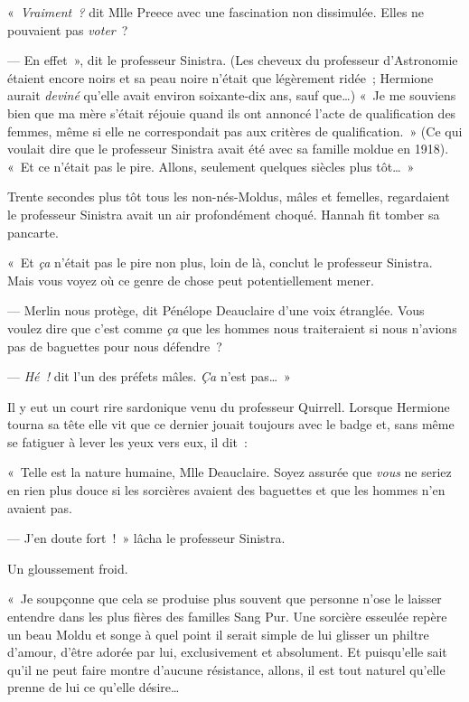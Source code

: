 «~\emph{Vraiment~?} dit Mlle Preece avec une fascination non dissimulée. Elles ne pouvaient pas \emph{voter}~?

--- En effet~», dit le professeur Sinistra. (Les cheveux du professeur d'Astronomie étaient encore noirs et sa peau noire n'était que légèrement ridée~; Hermione aurait \emph{deviné} qu'elle avait environ soixante-dix ans, sauf que…) «~Je me souviens bien que ma mère s'était réjouie quand ils ont annoncé l'acte de qualification des femmes, même si elle ne correspondait pas aux critères de qualification.~» (Ce qui voulait dire que le professeur Sinistra avait été avec sa famille moldue en 1918). «~Et ce n'était pas le pire. Allons, seulement quelques siècles plus tôt…~»

Trente secondes plus tôt tous les non-nés-Moldus, mâles et femelles, regardaient le professeur Sinistra avait un air profondément choqué. Hannah fit tomber sa pancarte.

«~Et \emph{ça} n'était pas le pire non plus, loin de là, conclut le professeur Sinistra. Mais vous voyez où ce genre de chose peut potentiellement mener.

--- Merlin nous protège, dit Pénélope Deauclaire d'une voix étranglée. Vous voulez dire que c'est comme \emph{ça} que les hommes nous traiteraient si nous n'avions pas de baguettes pour nous défendre~?

--- \emph{Hé~!} dit l'un des préfets mâles. \emph{Ça} n'est pas…~»

Il y eut un court rire sardonique venu du professeur Quirrell. Lorsque Hermione tourna sa tête elle vit que ce dernier jouait toujours avec le badge et, sans même se fatiguer à lever les yeux vers eux, il dit~:

«~Telle est la nature humaine, Mlle Deauclaire. Soyez assurée que \emph{vous} ne seriez en rien plus douce si les sorcières avaient des baguettes et que les hommes n'en avaient pas.

--- J'en doute fort~!~» lâcha le professeur Sinistra.

Un gloussement froid.

«~Je soupçonne que cela se produise plus souvent que personne n'ose le laisser entendre dans les plus fières des familles Sang Pur. Une sorcière esseulée repère un beau Moldu et songe à quel point il serait simple de lui glisser un philtre d'amour, d'être adorée par lui, exclusivement et absolument. Et puisqu'elle sait qu'il ne peut faire montre d'aucune résistance, allons, il est tout naturel qu'elle prenne de lui ce qu'elle désire…

